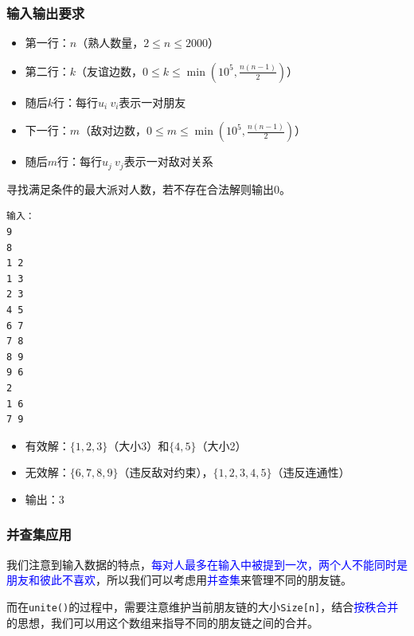 \documentclass[../mainReport.tex]{subfiles} %
\begin{document}
\subsubsection{输入输出要求}
\begin{itemize}
    \item 第一行：$n$（熟人数量，$2 \leq n \leq 2000$）
    \item 第二行：$k$（友谊边数，$0 \leq k \leq \min(10^5, \frac{n(n-1)}{2})$）
    \item 随后$k$行：每行$u_i\ v_i$表示一对朋友
    \item 下一行：$m$（敌对边数，$0 \leq m \leq \min(10^5, \frac{n(n-1)}{2})$）
    \item 随后$m$行：每行$u_j\ v_j$表示一对敌对关系
\end{itemize}

寻找满足条件的最大派对人数，若不存在合法解则输出0。

\begin{verbatim}
输入：
9
8
1 2
1 3
2 3
4 5
6 7
7 8
8 9
9 6
2
1 6
7 9
\end{verbatim}

\begin{itemize}
    \item 有效解：$\{1,2,3\}$（大小3）和$\{4,5\}$（大小2）
    \item 无效解：$\{6,7,8,9\}$（违反敌对约束），$\{1,2,3,4,5\}$（违反连通性）
    \item 输出：3
\end{itemize}

\subsubsection{并查集应用}
我们注意到输入数据的特点，\textcolor{blue}{每对人最多在输入中被提到一次，两个人不能同时是朋友和彼此不喜欢}，所以我们可以考虑用\textcolor{blue}{并查集}来管理不同的朋友链。

而在\verb|unite()|的过程中，需要注意维护当前朋友链的大小\verb|Size[n]|，结合\textcolor{blue}{按秩合并}的思想，我们可以用这个数组来指导不同的朋友链之间的合并。


\end{document}

